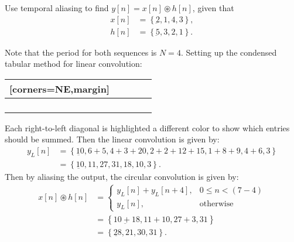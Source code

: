 \documentclass{report}
\begin{document}
\begin{example}
    Use temporal aliasing to find $y[n]=x[n]\circledast h[n]$, given that 
    \begin{align*}
        x[n] &= \left\{\underbar{2},1,4,3\right\}, \\
        h[n] &= \left\{\underbar{5},3,2,1\right\}.
    \end{align*}
\end{example}
\begin{solution}
    Note that the period for both sequences is $N=4$. Setting up the condensed tabular method for linear convolution: 
    \begin{center}
        \begin{NiceTabular}{p{1cm}|p{1cm} p{1cm} p{1cm} p{1cm}}[corners=NE,margin]
            \rule{0pt}{2em} &  &  &  &  \\
            \hline
             &  &  &  &  \\
             &  &  &  &  \\
             &  &  &  &  \\
             &  &  &  & 
        \end{NiceTabular}
    \end{center}
    Each right-to-left diagonal is highlighted a different color to show which entries should be summed. Then the linear convolution is given by:
    \begin{align*}
        y_L[n] &= \left\{\underbar{10},6+5,4+3+20,2+2+12+15,1+8+9,4+6,3\right\} \\
        &= \left\{\underbar{10},11,27,31,18,10,3\right\}.
    \end{align*}
    Then by aliasing the output, the circular convolution is given by:
    \begin{align*}
        x[n] \circledast h[n] &= 
        \begin{cases}
            y_L[n] + y_L[n+4], & 0 \leq n < (7-4) \\
            y_L[n], & \text{otherwise}
        \end{cases} \\
        &= \left\{\underbar{10+18},11+10,27+3,31\right\} \\
        &= \left\{\underbar{28},21,30,31\right\}.
    \end{align*}
\end{solution}
\end{document}
